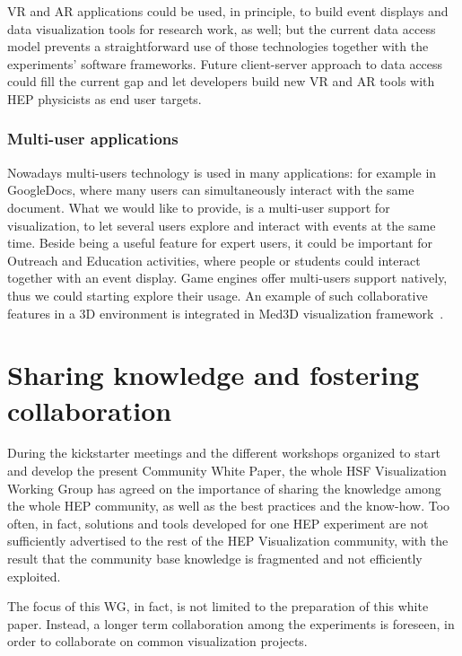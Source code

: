 \documentclass[12pt,a4paper]{article}
\begin{document}
VR and AR applications could be used, in principle, to build event displays and data visualization tools for research work, as well; but the current data access model prevents a straightforward use of those technologies together with the experiments' software frameworks. Future client-server approach to data access could fill the current gap and let developers build new VR and AR tools with HEP physicists as end user targets.


\hypertarget{multi-user}{%
\subsubsection{Multi-user applications}\label{multi-user}}

Nowadays multi-users technology is used in many applications: for example in GoogleDocs, where many users can simultaneously
interact with the same document. What we would like to provide, is a multi-user support for visualization, to let several users
explore and interact with events at the same time. Beside being a useful feature for expert users, it could be important for
Outreach and Education activities, where people or students could interact together with an event display.
Game engines offer multi-users support natively, thus we could starting explore their usage.
An example of such collaborative features in a 3D environment is integrated in Med3D visualization framework~\cite{Bohak2017}.

\hypertarget{sharing-knowledge}{%
\section{Sharing knowledge and fostering collaboration}\label{sharing-knowledge}}

During the kickstarter meetings and the different workshops organized to start and develop the present Community White Paper,
the whole HSF Visualization Working Group has agreed on the importance of sharing the knowledge among the whole HEP community,
as well as the best practices and the know-how. Too often, in fact, solutions and tools developed for one HEP experiment are
not sufficiently advertised to the rest of the HEP Visualization community, with the result that the community base knowledge
is fragmented and not efficiently exploited.

The focus of this WG, in fact, is not limited to the preparation of this white paper. Instead, a longer term collaboration
among the experiments is foreseen, in order to collaborate on common visualization projects.
\end{document}
